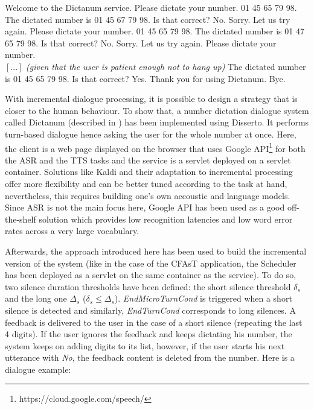         \begin{dialogue}
             Welcome to the Dictanum service. Please dictate your number.
             01 45 65 79 98.
             The dictated number is 01 45 67 79 98. Is that correct?
             No.
             Sorry. Let us try again. Please dictate your number.
             01 45 65 79 98.
             The dictated number is 01 47 65 79 98. Is that correct?
             No.
             Sorry. Let us try again. Please dictate your number. \\
            $\left[...\right]$ \textit{(given that the user is patient enough not to hang up)}
             The dictated number is 01 45 65 79 98. Is that correct?
             Yes.
             Thank you for using Dictanum. Bye.
        \end{dialogue}
        
        With incremental dialogue processing, it is possible to design a strategy that is closer to the human behaviour. To show that, a number dictation dialogue system called Dictanum (described in \cite{Khouzaimi2014c})  has been implemented using Disserto. It performs turn-based dialogue hence asking the user for the whole number at once. Here, the client is a web page displayed on the browser that uses Google API\footnote{https://cloud.google.com/speech/} for both the ASR and the TTS tasks and the service is a servlet deployed on a servlet container. Solutions like Kaldi \cite{Povey2011} and their adaptation to incremental processing \cite{Platek2014} offer more flexibility and can be better tuned according to the task at hand, nevertheless, this requires building one's own accoustic and language models. Since ASR is not the main focus here, Google API has been used as a good off-the-shelf solution which provides low recognition latencies and low word error rates across a very large vocabulary.
        
        Afterwards, the approach introduced here has been used to build the incremental version of the system (like in the case of the CFAsT application, the Scheduler has been deployed as a servlet on the same container as the service). To do so, two silence duration thresholds have been defined: the short silence threshold $\delta_s$ and the long one $\Delta_s$ ($\delta_s \leq \Delta_s$). \textit{EndMicroTurnCond} is triggered when a short silence is detected and similarly, \textit{EndTurnCond} corresponds to long silences. A feedback is delivered to the user in the case of a short silence (repeating the last 4 digits). If the user ignores the feedback and keeps dictating his number, the system keeps on adding digits to its list, however, if the user starts his next utterance with \textit{No}, the feedback content is deleted from the number. Here is a dialogue example:
        
